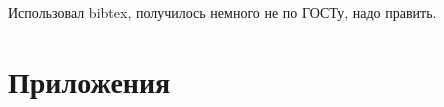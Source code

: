 \documentclass[a4paper,12pt]{article}
\begin{document}
\newpage
\renewcommand\refname{Список использованных источников}
Использовал bibtex, получилось немного не по ГОСТу, надо править.
\nocite{*}


\newpage\section*{Приложения}
\end{document}
